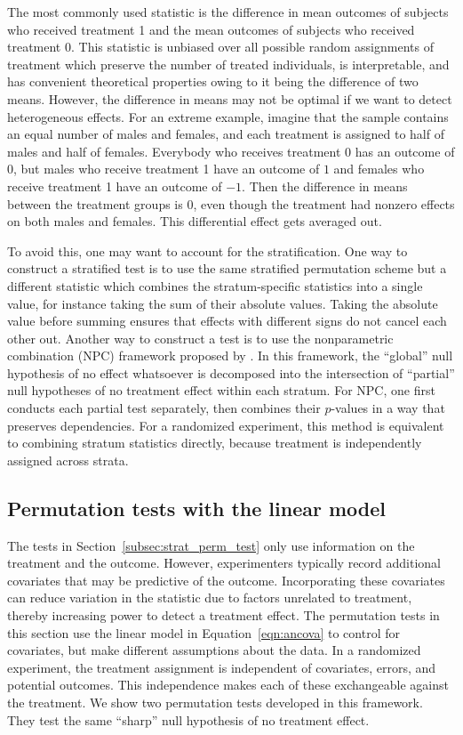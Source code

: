 \documentclass[12pt]{article}
\begin{document}
The most commonly used statistic is the difference in mean outcomes of subjects who received treatment 1 and the mean outcomes of subjects who received treatment 0.  
This statistic is unbiased over all possible random assignments of treatment which preserve the number of treated individuals,
is interpretable, 
and has convenient theoretical properties owing to it being the difference of two means.
However, the difference in means may not be optimal if we want to detect heterogeneous effects.  
For an extreme example, imagine that the sample contains an equal number of males and females, and each treatment is assigned to half of males and half of females.  
Everybody who receives treatment 0 has an outcome of 0, but males who receive treatment 1 have an outcome of $1$ and females who receive treatment 1 have an outcome of $-1$.  
Then the difference in means between the treatment groups is $0$, even though the treatment had nonzero effects on both males and females.  
This differential effect gets averaged out.

To avoid this, one may want to account for the stratification. 
One way to construct a stratified test is to use the same stratified permutation scheme but a different statistic which combines the stratum-specific statistics into a single value, for instance taking the sum of their absolute values.
Taking the absolute value before summing ensures that effects with different signs do not cancel each other out.
Another way to construct a test is to use the nonparametric combination (NPC) framework proposed by \citet{pesarin_permutation_2010}.
In this framework, the ``global'' null hypothesis of no effect whatsoever is decomposed into the intersection of ``partial'' null hypotheses of no treatment effect within each stratum.
For NPC, one first conducts each partial test separately, then combines their $p$-values in a way that preserves dependencies.
For a randomized experiment, this method is equivalent to combining stratum statistics directly, because treatment is independently assigned across strata.


\subsection{Permutation tests with the linear model}\label{subsec:lm_perm_tests}

The tests in Section~\ref{subsec:strat_perm_test} only use information on the treatment and the outcome.
However, experimenters typically record additional covariates that may be predictive of the outcome.
Incorporating these covariates can reduce variation in the statistic due to factors unrelated to treatment, thereby increasing power to detect a treatment effect.
The permutation tests in this section use the linear model in Equation~\ref{eqn:ancova} to control for covariates, but make different assumptions about the data.
In a randomized experiment, the treatment assignment is independent of covariates, errors, and potential outcomes.
This independence makes each of these exchangeable against the treatment.
We show two permutation tests developed in this framework.
They test the same ``sharp'' null hypothesis of no treatment effect.
\end{document}
